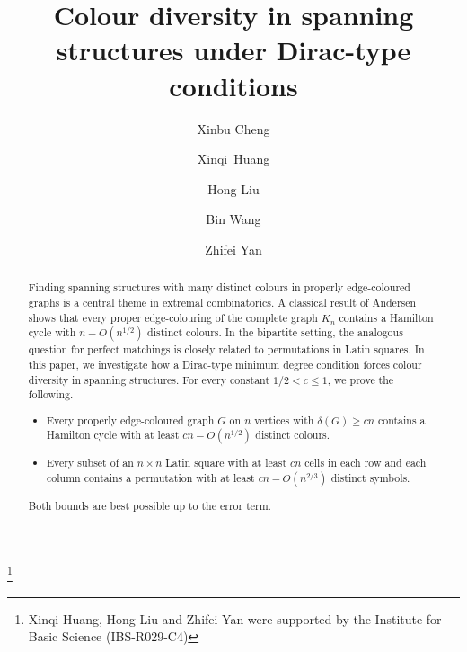 \documentclass[11pt,reqno]{amsart}
\theoremstyle{definition}
\theoremstyle{remark}
\renewcommand\le{\leqslant}
\renewcommand\ge{\geqslant}
\begin{document}
\title{Colour diversity in spanning structures under Dirac-type conditions}
\author{
Xinbu Cheng 
\and 
Xinqi~Huang
\and  
Hong Liu 
\and 
Bin Wang 
\and 
Zhifei Yan}

\address{IMPA, Estrada Dona Castorina 110, Jardim Bot\^anico,
Rio de Janeiro, 22460-320, Brazil}

\address{University of Science and Technology of China,
Hefei, 230026, China and ECOPRO, Institute for Basic Science, 55 Expo-ro, Yuseong-gu, Daejeon, 34126, Korea}

\address{ECOPRO, Institute for Basic Science, 55 Expo-ro, Yuseong-gu, Daejeon, 34126, Korea}


\address{School of Mathematics and Statistics, Beijing Institute of Technology, China}

\thanks{Xinqi Huang, Hong Liu and Zhifei Yan were supported by the Institute for Basic Science (IBS-R029-C4)}
	
\begin{abstract}
Finding spanning structures with many distinct colours in properly edge-coloured graphs is a central theme in extremal combinatorics. A classical result of Andersen shows that every proper edge-colouring of the complete graph $K_n$ contains a Hamilton cycle with $n - O(n^{1/2})$ distinct colours. In the bipartite setting, the analogous question for perfect matchings is closely related to permutations in Latin squares. In this paper, we investigate how a Dirac-type minimum degree condition forces colour diversity in spanning structures. For every constant $1/2 < c \le 1$, we prove the following.
\begin{itemize}
    \item Every properly edge-coloured graph $G$ on $n$ vertices with $\delta(G)\ge cn$ contains a Hamilton cycle with at least $cn - O(n^{1/2})$ distinct colours.

    \item Every subset of an $n\times n$ Latin square with at least $cn$ cells in each row and each column contains a permutation with at least $cn - O(n^{2/3})$ distinct symbols.
\end{itemize}
Both bounds are best possible up to the error term.
\end{abstract}


	
	\maketitle
\end{document}
